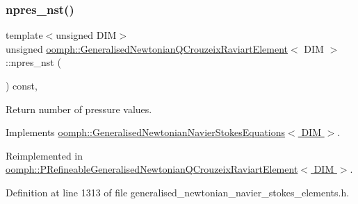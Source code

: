 \mbox{\label{classoomph_1_1GeneralisedNewtonianQCrouzeixRaviartElement_afdd70f9e267fd6acfb87c9a842c7812c}} 
\subsubsection{\texorpdfstring{npres\+\_\+nst()}{npres\_nst()}}
{\footnotesize\ttfamily template$<$unsigned D\+IM$>$ \\
unsigned \hyperlink{classoomph_1_1GeneralisedNewtonianQCrouzeixRaviartElement}{oomph\+::\+Generalised\+Newtonian\+Q\+Crouzeix\+Raviart\+Element}$<$ D\+IM $>$\+::npres\+\_\+nst (\begin{DoxyParamCaption}{ }\end{DoxyParamCaption}) const\hspace{0.3cm}{\ttfamily [inline]}, {\ttfamily [virtual]}}



Return number of pressure values. 



Implements \hyperlink{classoomph_1_1GeneralisedNewtonianNavierStokesEquations_ad25a5d1b7a7e7cf128b9154f08739824}{oomph\+::\+Generalised\+Newtonian\+Navier\+Stokes\+Equations$<$ D\+I\+M $>$}.



Reimplemented in \hyperlink{classoomph_1_1PRefineableGeneralisedNewtonianQCrouzeixRaviartElement_a68ed322582ba179cd0845bbd498e11b9}{oomph\+::\+P\+Refineable\+Generalised\+Newtonian\+Q\+Crouzeix\+Raviart\+Element$<$ D\+I\+M $>$}.



Definition at line 1313 of file generalised\+\_\+newtonian\+\_\+navier\+\_\+stokes\+\_\+elements.\+h.

\mbox{\label{classoomph_1_1GeneralisedNewtonianQCrouzeixRaviartElement_a243e373aca5dedfea4efb4d976434d3a}} 

